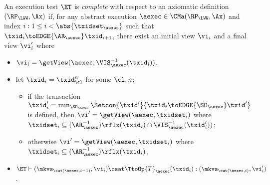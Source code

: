 \begin{definition}
\label{def:et_complete}
An execution test $\ET$ is \emph{complete} with respect 
to an axiomatic definition $(\RP_{\LWW}, \Ax)$ if, for any abstract execution $\aexec \in \CMa(\RP_{\LWW}, \Ax)$ 
and index \( i : 1 \leq i < \abs{\txidset_{\aexec}}\) such that \( \txid_{i} \toEDGE{\AR_{\aexec}} \txid_{i+1} \), there exist an initial view $\vi_{i}$ and a final view $\vi_{i}'$ where 
\begin{itemize}
\item $\vi_{i} = \getView(\aexec, \VIS_{\aexec}^{-1}(\txid_{i}))$, 
\item let $\txid_{i} = \txid_{\cl}^{n}$ for some $\cl, n$; 
    \begin{itemize}
        \item if the transaction $\txid_{i}' = \min_{\SO_{\aexec}}\Setcon{\txid' }{ \txid_i \toEDGE{\SO_{\aexec}} \txid'}$ is defined, then $\vi' = \getView(\aexec, \txidset_{i})$ where $\txidset_{i} \subseteq (\AR_{\aexec}^{-1})\rflx(\txid_{i}) \cap \VIS_{\aexec}^{-1}(\txid_{i}'))$; 
        \item otherwise $\vi' = \getView(\aexec, \txidset_{i})$ where $\txidset_{i} \subseteq (\AR_{\aexec}^{-1})\rflx(\txid_{i})$, 
    \end{itemize}
\item $\ET \vdash (\mkvs_{\cut(\aexec, i-1)}, \vi_{i}) \csat \TtoOp{T}_{\aexec}(\txid_{i}) : (\mkvs_{\cut(\aexec, i)},\vi_{i}')$.
\end{itemize}
\end{definition}


